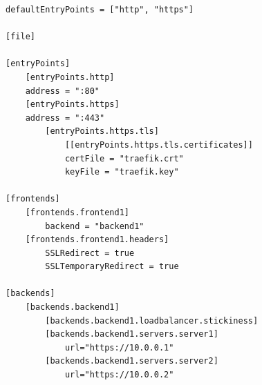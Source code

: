 \begin{Verbatim}[breaklines=true]
defaultEntryPoints = ["http", "https"]

[file]

[entryPoints]
    [entryPoints.http]
    address = ":80"
    [entryPoints.https]
    address = ":443"
        [entryPoints.https.tls]
            [[entryPoints.https.tls.certificates]]
            certFile = "traefik.crt"
            keyFile = "traefik.key"

[frontends]
    [frontends.frontend1]
        backend = "backend1"
    [frontends.frontend1.headers]
        SSLRedirect = true
        SSLTemporaryRedirect = true

[backends]
    [backends.backend1]
        [backends.backend1.loadbalancer.stickiness]
        [backends.backend1.servers.server1]
            url="https://10.0.0.1"
        [backends.backend1.servers.server2]
            url="https://10.0.0.2"
\end{Verbatim}

